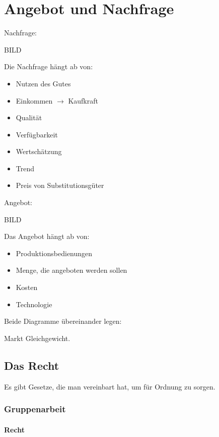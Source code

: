 \documentclass[a4paper]{report}
\begin{document}
\chapter{Angebot und Nachfrage}

Nachfrage:
\newline
\newline

BILD

Die Nachfrage hängt ab von:

\begin{itemize}
\item Nutzen des Gutes
\item Einkommen $\rightarrow$ Kaufkraft
\item Qualität
\item Verfügbarkeit
\item Wertschätzung
\item Trend
\item Preis von Substitutionsgüter
\end{itemize}

Angebot:

BILD

Das Angebot hängt ab von:

\begin{itemize}
\item Produktionsbedienungen
\item Menge, die angeboten werden sollen
\item Kosten
\item Technologie
\end{itemize}

Beide Diagramme übereinander legen:
\newline
\newline

Markt Gleichgewicht.

\newpage

\section{Das Recht}

Es gibt Gesetze, die man vereinbart hat, um für Ordnung zu sorgen.

\subsection{Gruppenarbeit}

\subsubsection{Recht}
\end{document}
